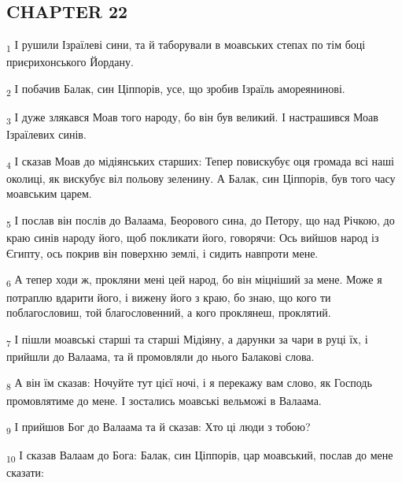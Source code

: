 \subsection{CHAPTER 22}
\begin{tcolorbox}
\textsubscript{1} І рушили Ізраїлеві сини, та й таборували в моавських степах по тім боці приєрихонського Йордану.
\end{tcolorbox}
\begin{tcolorbox}
\textsubscript{2} І побачив Балак, син Ціппорів, усе, що зробив Ізраїль амореянинові.
\end{tcolorbox}
\begin{tcolorbox}
\textsubscript{3} І дуже злякався Моав того народу, бо він був великий. І настрашився Моав Ізраїлевих синів.
\end{tcolorbox}
\begin{tcolorbox}
\textsubscript{4} І сказав Моав до мідіянських старших: Тепер повискубує оця громада всі наші околиці, як вискубує віл польову зеленину. А Балак, син Ціппорів, був того часу моавським царем.
\end{tcolorbox}
\begin{tcolorbox}
\textsubscript{5} І послав він послів до Валаама, Беорового сина, до Петору, що над Річкою, до краю синів народу його, щоб покликати його, говорячи: Ось вийшов народ із Єгипту, ось покрив він поверхню землі, і сидить навпроти мене.
\end{tcolorbox}
\begin{tcolorbox}
\textsubscript{6} А тепер ходи ж, прокляни мені цей народ, бо він міцніший за мене. Може я потраплю вдарити його, і вижену його з краю, бо знаю, що кого ти поблагословиш, той благословенний, а кого проклянеш, проклятий.
\end{tcolorbox}
\begin{tcolorbox}
\textsubscript{7} І пішли моавські старші та старші Мідіяну, а дарунки за чари в руці їх, і прийшли до Валаама, та й промовляли до нього Балакові слова.
\end{tcolorbox}
\begin{tcolorbox}
\textsubscript{8} А він їм сказав: Ночуйте тут цієї ночі, і я перекажу вам слово, як Господь промовлятиме до мене. І зостались моавські вельможі в Валаама.
\end{tcolorbox}
\begin{tcolorbox}
\textsubscript{9} І прийшов Бог до Валаама та й сказав: Хто ці люди з тобою?
\end{tcolorbox}
\begin{tcolorbox}
\textsubscript{10} І сказав Валаам до Бога: Балак, син Ціппорів, цар моавський, послав до мене сказати:
\end{tcolorbox}
